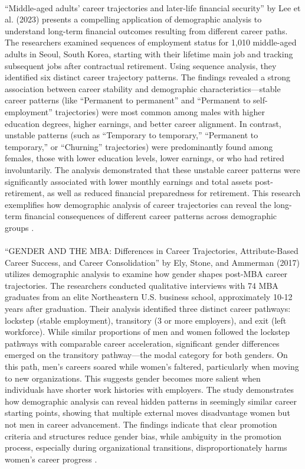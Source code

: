 \documentclass[../main.tex]{subfiles}
\begin{document}
\paragraph{} ``Middle-aged adults' career trajectories and later-life financial security'' by Lee et al. (2023) presents a compelling application of demographic analysis to understand long-term financial outcomes resulting from different career paths. The researchers examined sequences of employment status for 1,010 middle-aged adults in Seoul, South Korea, starting with their lifetime main job and tracking subsequent jobs after contractual retirement. Using sequence analysis, they identified six distinct career trajectory patterns. The findings revealed a strong association between career stability and demographic characteristics—stable career patterns (like ``Permanent to permanent'' and ``Permanent to self-employment'' trajectories) were most common among males with higher education degrees, higher earnings, and better career alignment. In contrast, unstable patterns (such as ``Temporary to temporary,'' ``Permanent to temporary,'' or ``Churning'' trajectories) were predominantly found among females, those with lower education levels, lower earnings, or who had retired involuntarily. The analysis demonstrated that these unstable career patterns were significantly associated with lower monthly earnings and total assets post-retirement, as well as reduced financial preparedness for retirement. This research exemplifies how demographic analysis of career trajectories can reveal the long-term financial consequences of different career patterns across demographic groups \citep{lee2023middle}.

\paragraph{} ``GENDER AND THE MBA: Differences in Career Trajectories, Attribute-Based Career Success, and Career Consolidation'' by Ely, Stone, and Ammerman (2017) utilizes demographic analysis to examine how gender shapes post-MBA career trajectories. The researchers conducted qualitative interviews with 74 MBA graduates from an elite Northeastern U.S. business school, approximately 10-12 years after graduation. Their analysis identified three distinct career pathways: lockstep (stable employment), transitory (3 or more employers), and exit (left workforce). While similar proportions of men and women followed the lockstep pathways with comparable career acceleration, significant gender differences emerged on the transitory pathway—the modal category for both genders. On this path, men's careers soared while women's faltered, particularly when moving to new organizations. This suggests gender becomes more salient when individuals have shorter work histories with employers. The study demonstrates how demographic analysis can reveal hidden patterns in seemingly similar career starting points, showing that multiple external moves disadvantage women but not men in career advancement. The findings indicate that clear promotion criteria and structures reduce gender bias, while ambiguity in the promotion process, especially during organizational transitions, disproportionately harms women's career progress \citep{ely2017gender}.
\end{document}
